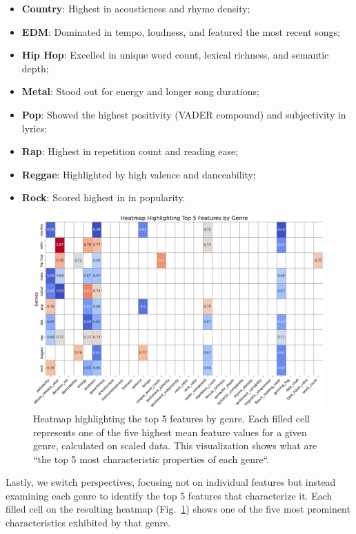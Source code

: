 \begin{itemize}
  \item \textbf{Country}: Highest in acousticness and rhyme density;
  \item \textbf{EDM}: Dominated in tempo, loudness, and featured the most
    recent songs;
  \item \textbf{Hip Hop}: Excelled in unique word count, lexical richness, and
    semantic depth;
  \item \textbf{Metal}: Stood out for energy and longer song durations;
  \item \textbf{Pop}: Showed the highest positivity (VADER compound) and
    subjectivity in lyrics;
  \item \textbf{Rap}: Highest in repetition count and reading ease;
  \item \textbf{Reggae}: Highlighted by high valence and danceability;
  \item \textbf{Rock}: Scored highest in in popularity.
    
\end{itemize}

\begin{center}
\begin{figure}[H]
  \centering
  \includegraphics[width=6in]{img/heatmap_top_feature_values_by_genre.png}
  \caption{Heatmap highlighting the top 5 features by genre. Each filled cell
    represents one of the five highest mean feature values for a given genre,
    calculated on scaled data. This visualization shows what are ``the top 5
    most characteristic properties of each genre``. }
  \label{Figure:heatmap_top_feature_values_by_genre}
\end{figure}
\end{center}

Lastly, we switch perspectives, focusing not on individual features but instead
examining each genre to identify the top 5 features that characterize it. Each
filled cell on the resulting
heatmap (Fig.~\ref{Figure:heatmap_top_feature_values_by_genre}) shows one of the
five most prominent characteristics exhibited by that genre.

